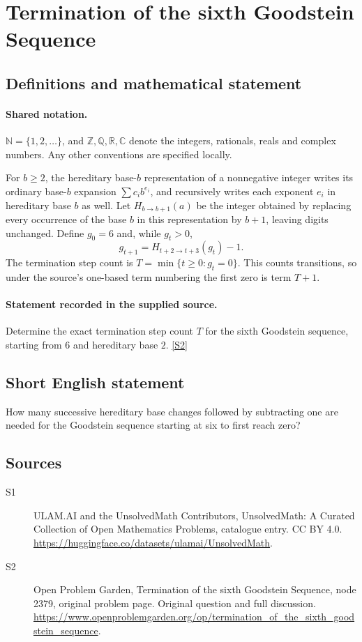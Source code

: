 \documentclass[11pt]{article}
\newcommand{\sref}[2]{\hyperlink{source:#1:#2}{[S#2]}}
\begin{document}
\section{Termination of the sixth Goodstein Sequence}\label{statement}

\subsection{Definitions and mathematical statement}

\paragraph{Shared notation.}$\mathbb N=\{1,2,\ldots\}$, and $\mathbb Z,\mathbb Q,\mathbb R,\mathbb C$ denote the integers, rationals, reals and complex numbers. Any other conventions are specified locally.


For $b\geq2$, the hereditary base-$b$ representation of a nonnegative integer writes its ordinary base-$b$ expansion $\sum c_i b^{e_i}$, and recursively writes each exponent $e_i$ in hereditary base $b$ as well. Let $H_{b\to b+1}(a)$ be the integer obtained by replacing every occurrence of the base $b$ in this representation by $b+1$, leaving digits unchanged. Define $g_0=6$ and, while $g_t>0$,\[ g_{t+1}=H_{t+2\to t+3}(g_t)-1. \] The termination step count is $T=\min\{t\geq0:g_t=0\}$. This counts transitions, so under the source's one-based term numbering the first zero is term $T+1$.
\paragraph{Statement recorded in the supplied source.}
Determine the exact termination step count $T$ for the sixth Goodstein sequence, starting from $6$ and hereditary base $2$. \sref{statement}{2}
\subsection{Short English statement}
How many successive hereditary base changes followed by subtracting one are needed for the Goodstein sequence starting at six to first reach zero?
\subsection{Sources}
\begin{description}
\item[\hypertarget{source:statement:1}{S1}] ULAM.AI and the UnsolvedMath Contributors, UnsolvedMath: A Curated Collection of Open Mathematics Problems, catalogue entry. CC BY 4.0. \url{https://huggingface.co/datasets/ulamai/UnsolvedMath}.
\item[\hypertarget{source:statement:2}{S2}] Open Problem Garden, Termination of the sixth Goodstein Sequence, node 2379, original problem page. Original question and full discussion. \url{https://www.openproblemgarden.org/op/termination_of_the_sixth_goodstein_sequence}.

\end{description}
\label{end:statement}
\end{document}
